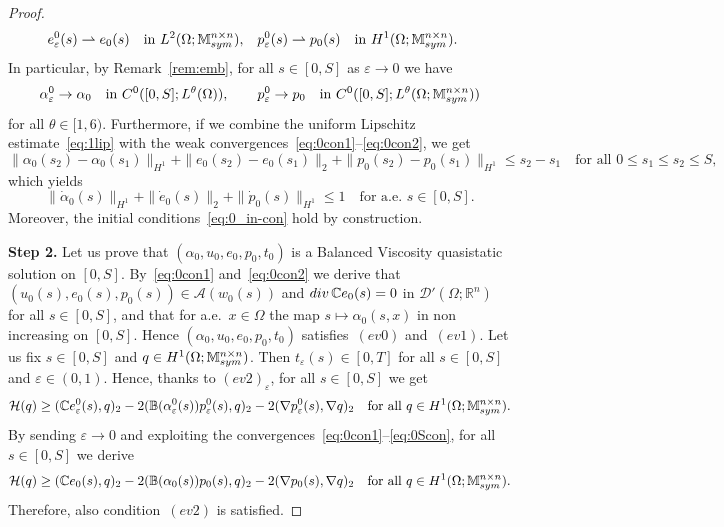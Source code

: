 \documentclass[reqno]{amsart}
\theoremstyle{definition}
\numberwithin{equation}{section}
\def\div {\mathop {\rm div}\nolimits}
\def\R {\mathbb R}
\def\M {\mathbb M^{n\times n}_{\rm sym}}
\def\C {\mathbb C}
\def\B {\mathbb B}
\begin{document}
\begin{proof}
\begin{align}
& e_\varepsilon^0(s)\rightharpoonup e_0(s)\quad\text{in $L^2(\Omega;\M)$}, & & p_\varepsilon^0(s)\rightharpoonup p_0(s)\quad\text{in $H^1(\Omega;\M)$}.\label{eq:0con2}
\end{align}
In particular, by Remark~\ref{rem:emb}, for all $s\in[0,S]$  as $\varepsilon \to 0$ we have
\begin{align}
\alpha_\varepsilon^0\to \alpha_0\quad\text{in $C^0([0,S];L^\theta(\Omega))$},\qquad p_\varepsilon^0\to p_0\quad\text{in $C^0([0,S];L^\theta(\Omega;\M))$}\label{eq:0Scon}
\end{align}
for all $\theta\in[1,6)$.  Furthermore, if we  combine the uniform Lipschitz estimate~\eqref{eq:1lip} with the weak convergences~\eqref{eq:0con1}--\eqref{eq:0con2}, we get
$$\|\alpha_0(s_2)-\alpha_0(s_1)\|_{H^1}+\|e_0(s_2)-e_0(s_1)\|_2+\|p_0(s_2)-p_0(s_1)\|_{H^1}\le s_2-s_1\quad\text{for all $0\le s_1\le s_2\le S$},$$
which yields
$$\|\dot\alpha_0(s)\|_{H^1}+\|\dot e_0(s)\|_2+\|\dot p_0(s)\|_{H^1}\le 1\quad\text{for a.e.\ $s\in[0,S]$}.$$
Moreover, the initial conditions~\eqref{eq:0_in-con} hold by construction.

{\bf Step 2.} Let us prove that $(\alpha_0,u_0,e_0,p_0,t_0)$ is a Balanced Viscosity quasistatic solution on $[0,S]$. By~\eqref{eq:0con1} and~\eqref{eq:0con2} we derive that $(u_0(s),e_0(s),p_0(s))\in\mathcal A(w_0(s))$ and $\div\C e_0(s)=0$ in $\mathcal D'(\Omega;\R^n)$ for all $s\in[0,S]$, and that for a.e.\ $x\in\Omega$ the map $s\mapsto\alpha_0(s,x)$ in non increasing on $[0,S]$. Hence $(\alpha_0,u_0,e_0,p_0,t_0)$ satisfies~$(ev0)$ and~$(ev1)$.  
Let us fix $s\in[0,S]$ and $q\in H^1(\Omega;\M)$. Then $t_\varepsilon(s)\in [0,T]$ for all $s\in[0,S]$ and $\varepsilon\in(0,1)$. Hence, thanks to $(ev2)_\varepsilon$, for all $s\in[0,S]$ we get
\begin{equation*}
\mathcal H(q)\ge (\C e_\varepsilon^0(s),q)_2-2(\B(\alpha_\varepsilon^0(s))p_\varepsilon^0(s),q)_2-2(\nabla p_\varepsilon^0(s),\nabla q)_2\quad\text{for all $q\in H^1(\Omega;\M)$}.
\end{equation*}
By sending $\varepsilon\to 0$ and exploiting the convergences~\eqref{eq:0con1}--\eqref{eq:0Scon}, for all $s\in[0,S]$ we derive
\begin{equation*}
\mathcal H(q)\ge (\C e_0(s),q)_2-2(\B(\alpha_0(s))p_0(s),q)_2-2(\nabla p_0(s),\nabla q)_2\quad\text{for all $q\in H^1(\Omega;\M)$}.
\end{equation*}
Therefore, also condition~$(ev2)$ is satisfied.


\end{proof}
\end{document}
